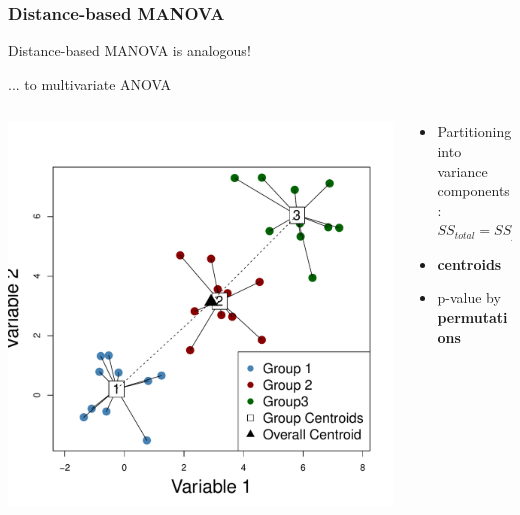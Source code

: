 \documentclass[10pt]{beamer}\usepackage[]{graphicx}\usepackage[]{color}
\makeatletter
\def\maxwidth{ %
  \ifdim\Gin@nat@width>\linewidth
    \linewidth
  \else
    \Gin@nat@width
  \fi
}
\newenvironment{knitrout}{}{} %
\renewcommand{\footnotesize}{\scriptsize}
\makeatother
\begin{document}
\begin{frame}[fragile]
  \frametitle{Distance-based MANOVA}
Distance-based MANOVA is analogous!
  \begin{block}{... to multivariate ANOVA}
  \begin{columns}
  \begin{column}{5cm}
\begin{knitrout}\footnotesize
{}\color{fgcolor}

{\centering \includegraphics[width=\maxwidth]{figs/permanova2-1} 

}



\end{knitrout}
      \end{column}
      \begin{column}{5cm}
      \begin{itemize}
      \item Partitioning into variance components:\\
            $SS_{total} = SS_{group} + SS_{residual}$
      \item \textbf{centroids}
      \item p-value by \textbf{permutations}
      \end{itemize}
      \end{column}
  \end{columns}
  \end{block}
\end{frame}
\end{document}
